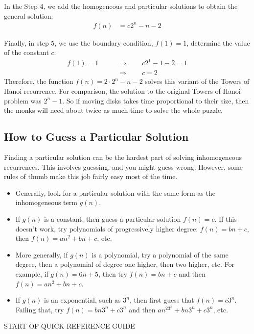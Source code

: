 In the Step 4, we add the homogeneous and particular solutions to
obtain the general solution:
\begin{align*}
f(n) & = c 2^n - n - 2
\end{align*}

Finally, in step 5, we use the boundary condition, $f(1) = 1$,
determine the value of the constant $c$:
\begin{align*}
f(1) = 1 \qquad & \Rightarrow \qquad c 2^1 - 1 - 2 = 1 \\
  & \Rightarrow \qquad c = 2
\end{align*}
Therefore, the function $f(n) = 2 \cdot 2^n - n - 2$ solves this
variant of the Towers of Hanoi recurrence.  For comparison, the
solution to the original Towers of Hanoi problem was $2^n - 1$.  So if
moving disks takes time proportional to their size, then the monks
will need about twice as much time to solve the whole puzzle.

\subsection{How to Guess a Particular Solution}

Finding a particular solution can be the hardest part of solving
inhomogeneous recurrences. This involves guessing, and you might guess
wrong. However, some rules of thumb make this job fairly easy most of
the time.

\begin{itemize}
\item Generally, look for a particular solution with the same form as
  the inhomogeneous term $g(n)$.
\item If $g(n)$ is a constant, then guess a particular solution $f(n)
  = c$. If this doesn't work, try polynomials of progressively higher
  degree:  $f(n)=bn+c$, then $f(n)=an^2 +bn+c$, etc.
\item More generally, if $g(n)$ is a polynomial, try a polynomial of
  the same degree, then a polynomial of degree one higher, then two
  higher, etc. For example, if $g(n) = 6n + 5$, then try $f(n)=bn+c$
  and then $f(n)=an^2 +bn+c$.
\item If $g(n)$ is an exponential, such as $3^n$, then first guess
  that $f(n) = c3^n$. Failing that, try $f(n) = bn3^n + c3^n$ and then
  $an^23^n + bn3^n + c3^n$, etc.
\end{itemize}

\begin{center}
START OF QUICK REFERENCE GUIDE
\end{center}

